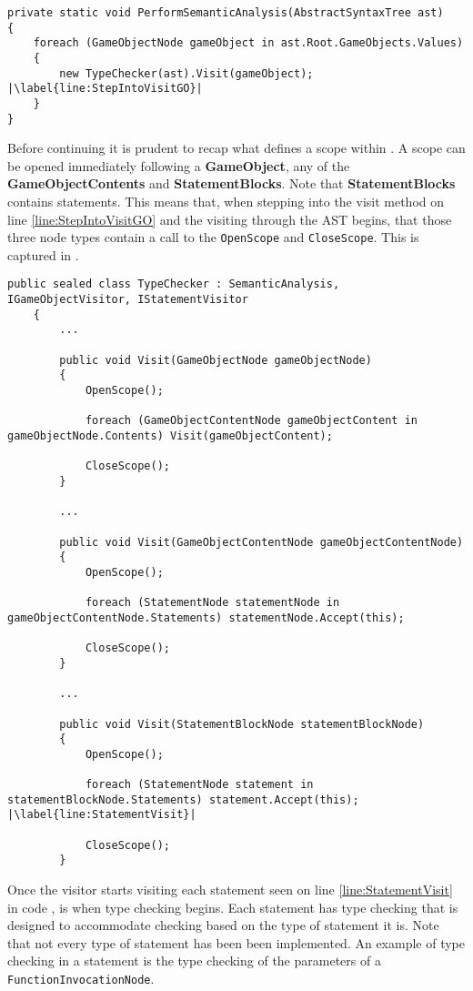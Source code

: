 \begin{lstlisting}[language=CSharp, caption={Typechecker object for every GameObject}, label={lst:TypeCheckEachGO},escapechar=|]
private static void PerformSemanticAnalysis(AbstractSyntaxTree ast)
{
    foreach (GameObjectNode gameObject in ast.Root.GameObjects.Values)
    {
        new TypeChecker(ast).Visit(gameObject); |\label{line:StepIntoVisitGO}|
    }
}
\end{lstlisting}

Before continuing it is prudent to recap what defines a scope within \dazel{}. A scope can be opened immediately following a \textbf{GameObject}, any of the \textbf{GameObjectContents} and \textbf{StatementBlocks}. Note that \textbf{StatementBlocks} contains statements. 
This means that, when stepping into the visit method on line \ref{line:StepIntoVisitGO} and the visiting through the AST begins, that those three node types contain a call to the \texttt{OpenScope} and \texttt{CloseScope}. This is captured in .

\begin{lstlisting}[language=CSharp, caption={Applying Scope to GameObjects, GameObjectContents and StatementBlocks}, label={lst:ApplyScope},escapechar=|]
    public sealed class TypeChecker : SemanticAnalysis, IGameObjectVisitor, IStatementVisitor
    {
        ...

        public void Visit(GameObjectNode gameObjectNode)
        {
            OpenScope();

            foreach (GameObjectContentNode gameObjectContent in gameObjectNode.Contents) Visit(gameObjectContent);

            CloseScope();
        }

        ...

        public void Visit(GameObjectContentNode gameObjectContentNode)
        {
            OpenScope();

            foreach (StatementNode statementNode in gameObjectContentNode.Statements) statementNode.Accept(this);

            CloseScope();
        }

        ... 

        public void Visit(StatementBlockNode statementBlockNode)
        {
            OpenScope();

            foreach (StatementNode statement in statementBlockNode.Statements) statement.Accept(this); |\label{line:StatementVisit}|

            CloseScope();
        }
\end{lstlisting}

Once the visitor starts visiting each statement seen on line \ref{line:StatementVisit} in code , is when type checking begins. Each statement has type checking that is designed to accommodate checking based on the type of statement it is. Note that not every type of statement has been been implemented.
An example of type checking in a statement is the type checking of the parameters of a \texttt{FunctionInvocationNode}. 